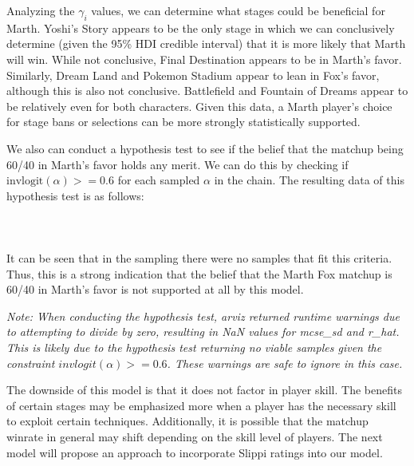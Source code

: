 Analyzing the $\gamma_i$ values, we can determine what stages could be beneficial for Marth. Yoshi's Story appears to be the only stage in which we can conclusively determine (given the 95\% HDI credible interval) that it is more likely that Marth will win. While not conclusive, Final Destination appears to be in Marth's favor. Similarly, Dream Land and Pokemon Stadium appear to lean in Fox's favor, although this is also not conclusive. Battlefield and Fountain of Dreams appear to be relatively even for both characters. Given this data, a Marth player's choice for stage bans or selections can be more strongly statistically supported.

We also can conduct a hypothesis test to see if the belief that the matchup being 60/40 in Marth's favor holds any merit. We can do this by checking if $\text{invlogit}(\alpha) >= 0.6$ for each sampled $\alpha$ in the chain. The resulting data of this hypothesis test is as follows:
\\\\
\\\\
It can be seen that in the sampling there were no samples that fit this criteria. Thus, this is a strong indication that the belief that the Marth Fox matchup is 60/40 in Marth's favor is not supported at all by this model.

\textit{Note: When conducting the hypothesis test, arviz returned runtime warnings due to attempting to divide by zero, resulting in NaN values for mcse\_sd and r\_hat. This is likely due to the hypothesis test returning no viable samples given the constraint $invlogit(\alpha) >= 0.6$. These warnings are safe to ignore in this case.}

The downside of this model is that it does not factor in player skill. The benefits of certain stages may be emphasized more when a player has the necessary skill to exploit certain techniques. Additionally, it is possible that the matchup winrate in general may shift depending on the skill level of players. The next model will propose an approach to incorporate Slippi ratings into our model.

